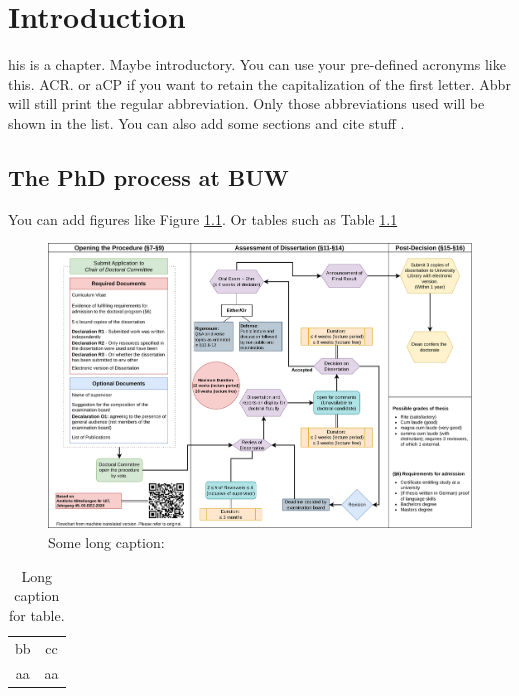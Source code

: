 \chapter{Introduction} \label{chapter_1}


his is a chapter. Maybe introductory. 
You can use your pre-defined acronyms like this. \Gls{ACR}. or \gls{aCP} if you want to retain the capitalization of the first letter. \Gls{Abbr} will still print the regular abbreviation. Only those abbreviations used will be shown in the list. You can also add some sections and cite stuff \cite{citation1}. 

\section{The PhD process at BUW}
You can add figures like Figure \ref{fig_BUW_process}. Or tables such as Table \ref{tab:my_label}

\begin{figure}
    \centering
    \includegraphics[width=\linewidth]{assets/PhDProcess.png}
    \caption[Short caption for TOC]{Some long caption: \lipsum[2-2]}
    \label{fig_BUW_process}
\end{figure}


\begin{table}[htb!]
    \centering
    \begin{tabular}{c|c}
        bb & cc \\
         aa & aa
    \end{tabular}
    \caption[TOC caption]{Long caption for table.}
    \label{tab:my_label}
\end{table}